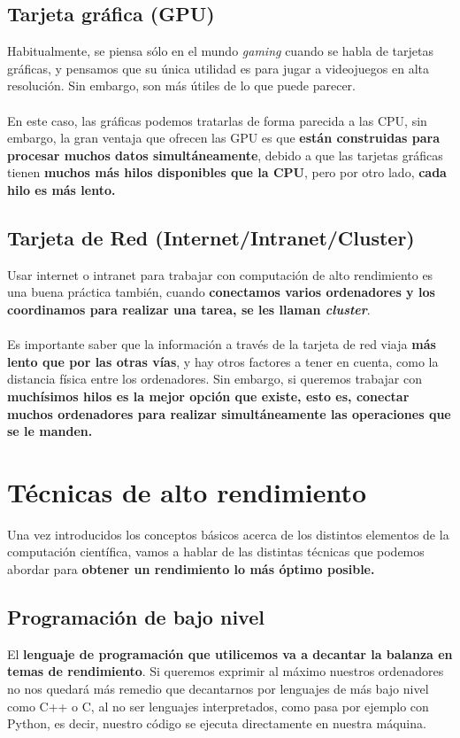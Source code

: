 \subsection{Tarjeta gráfica (GPU)}
Habitualmente, se piensa sólo en el mundo \textit{gaming} cuando se habla de tarjetas gráficas, y pensamos que su única utilidad es para jugar a videojuegos en alta resolución. Sin embargo, son más útiles de lo que puede parecer. \\ \\
En este caso, las gráficas podemos tratarlas de forma parecida a las CPU, sin embargo, la gran ventaja que ofrecen las GPU es que \textbf{están construidas para procesar muchos datos simultáneamente}, debido a que las tarjetas gráficas tienen \textbf{muchos más hilos disponibles que la CPU}, pero por otro lado, \textbf{cada hilo es más lento.}

\subsection{Tarjeta de Red (Internet/Intranet/Cluster)}
Usar internet o intranet para trabajar con computación de alto rendimiento es una buena práctica también, cuando \textbf{conectamos varios ordenadores y los coordinamos para realizar una tarea, se les llaman \textit{cluster}}. \\ \\
Es importante saber que la información a través de la tarjeta de red viaja \textbf{más lento que por las otras vías}, y hay otros factores a tener en cuenta, como la distancia física entre los ordenadores. Sin embargo, si queremos trabajar con \textbf{muchísimos hilos es la mejor opción que existe, esto es, conectar muchos ordenadores para realizar simultáneamente las operaciones que se le manden.}

\section{Técnicas de alto rendimiento}

Una vez introducidos los conceptos básicos acerca de los distintos elementos de la computación científica, vamos a hablar de las distintas técnicas que podemos abordar para \textbf{obtener un rendimiento lo más óptimo posible.}

\subsection{Programación de bajo nivel}
El \textbf{lenguaje de programación que utilicemos va a decantar la balanza en temas de rendimiento}. Si queremos exprimir al máximo nuestros ordenadores no nos quedará más remedio que decantarnos por lenguajes de más bajo nivel como C++ o C, al no ser lenguajes interpretados, como pasa por ejemplo con Python, es decir, nuestro código se ejecuta directamente en nuestra máquina.

